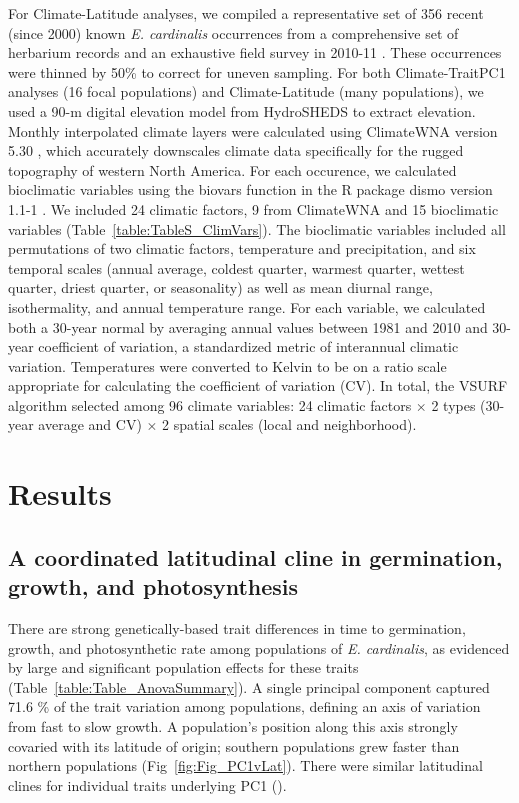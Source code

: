 \documentclass[11pt, oneside]{article}
\newcommand{\pkg}[1]{{\fontseries{b}\selectfont #1}}
\begin{document}
For Climate-Latitude analyses, we compiled a representative set of 356 recent (since 2000) known \textit{E. cardinalis} occurrences from a comprehensive set of herbarium records and an exhaustive field survey in 2010-11 \citep{Angert_ENM}. These occurrences were thinned by 50\% to correct for uneven sampling. For both Climate-TraitPC1 analyses (16 focal populations) and Climate-Latitude (many populations), we used a 90-m digital elevation model from HydroSHEDS \citep{Lehner_etal_2006} to extract elevation. Monthly interpolated climate layers were calculated using ClimateWNA version 5.30 \citep{Wang_etal_2012}, which accurately downscales climate data specifically for the rugged topography of western North America. For each occurence, we calculated bioclimatic variables using the biovars function in the R package \pkg{dismo} version 1.1-1 \citep{Hijmans_etal_2016}. We included 24 climatic factors, 9 from ClimateWNA and 15 bioclimatic variables (Table~\ref{table:TableS_ClimVars}). The bioclimatic variables included all permutations of two climatic factors, temperature and precipitation, and six temporal scales (annual average, coldest quarter, warmest quarter, wettest quarter, driest quarter, or seasonality) as well as mean diurnal range, isothermality, and annual temperature range. For each variable, we calculated both a 30-year normal by averaging annual values between 1981 and 2010 and 30-year coefficient of variation, a standardized metric of interannual climatic variation. Temperatures were converted to Kelvin to be on a ratio scale appropriate for calculating the coefficient of variation (CV). In total, the VSURF algorithm selected among 96 climate variables: 24 climatic factors $\times$ 2 types (30-year average and CV) $\times$ 2 spatial scales (local and neighborhood).


\section*{Results}

\subsection*{A coordinated latitudinal cline in germination, growth, and photosynthesis}

There are strong genetically-based trait differences in time to germination, growth, and photosynthetic rate among populations of \textit{E. cardinalis}, as evidenced by large and significant population effects for these traits (Table~\ref{table:Table_AnovaSummary}). A single principal component captured 71.6 \% of the trait variation among populations, defining an axis of variation from fast to slow growth. A population's position along this axis strongly covaried with its latitude of origin; southern populations grew faster than northern populations (Fig~\ref{fig:Fig_PC1vLat}). There were similar latitudinal clines for individual traits underlying PC1 ().
\end{document}
